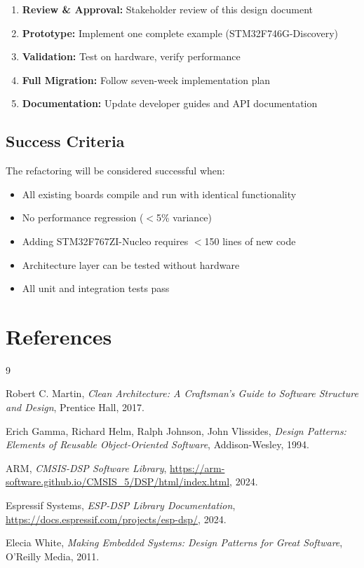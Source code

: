 \documentclass[11pt,a4paper]{article}
\begin{document}
\begin{enumerate}
    \item \textbf{Review \& Approval:} Stakeholder review of this design document
    \item \textbf{Prototype:} Implement one complete example (STM32F746G-Discovery)
    \item \textbf{Validation:} Test on hardware, verify performance
    \item \textbf{Full Migration:} Follow seven-week implementation plan
    \item \textbf{Documentation:} Update developer guides and API documentation
\end{enumerate}

\subsection{Success Criteria}

The refactoring will be considered successful when:

\begin{itemize}
    \item All existing boards compile and run with identical functionality
    \item No performance regression ($<$5\% variance)
    \item Adding STM32F767ZI-Nucleo requires $<$150 lines of new code
    \item Architecture layer can be tested without hardware
    \item All unit and integration tests pass
\end{itemize}

\newpage
\section*{References}

\begin{thebibliography}{9}

Robert C. Martin,
\textit{Clean Architecture: A Craftsman's Guide to Software Structure and Design},
Prentice Hall, 2017.

Erich Gamma, Richard Helm, Ralph Johnson, John Vlissides,
\textit{Design Patterns: Elements of Reusable Object-Oriented Software},
Addison-Wesley, 1994.

ARM,
\textit{CMSIS-DSP Software Library},
\url{https://arm-software.github.io/CMSIS_5/DSP/html/index.html}, 2024.

Espressif Systems,
\textit{ESP-DSP Library Documentation},
\url{https://docs.espressif.com/projects/esp-dsp/}, 2024.

Elecia White,
\textit{Making Embedded Systems: Design Patterns for Great Software},
O'Reilly Media, 2011.

\end{thebibliography}
\end{document}
